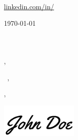 \documentclass[12pt]{letter}
\begin{document}
    \AddToShipoutPictureBG{%
    \color{teal}
    \AtPageUpperLeft{\rule[-1.33in]{\paperwidth}{1.3in}}
    }
    \AddToShipoutPictureBG{%
    \color{darkgray}
    \AtPageUpperLeft{\rule[-1.3in]{\paperwidth}{1.3in}}
    }
    \AddToShipoutPictureBG{%
    \color{teal}
    \AtPageUpperLeft{\rule[-0.03in]{\paperwidth}{1.3in}}
    }
    
    \begin{center}
    {\fontsize{28}{0}\selectfont\scshape \textcolor{headText}{\myname}}

    \href{mailto:\myemail}{\textcolor{accent}{\faEnvelope}\enspace \textcolor{headText}{\myemail}}\hfill
    \href{https://linkedin.com/in/\mylinkedin}{\textcolor{accent}{\faLinkedinIn}\enspace \textcolor{headText}{linkedin.com/in/\mylinkedin}}\hfill
    \href{tel:\myphone}{\textcolor{accent}{\faPhone}\enspace \textcolor{headText}{\myphone}}\hfill
    \textcolor{accent}{\faMapMarker} \enspace \textcolor{headText}{\mylocation}
    \end{center}
    
    \vspace{0.2in}
    
    \today\\
    
    \vspace{-0.1in}\recipient\\
    \company\\
    \street\\
    \city, \state\ \zip\\

    \subject \\
    
    \vspace{-0.1in}\greeting\ \recipient,\\
    
    \vspace{-0.1in}\setlength\parindent{24pt}
    \noindent
    
    \vspace{0.1in}
    \vfill
    
    \begin{flushright}
    \closer,
    
    \vspace{-0.1in}\includegraphics[width=1.5in]{sig.png}\vspace{-0.1in}
    
    \myname\\
    \mytitle
    \end{flushright}
\end{document}
